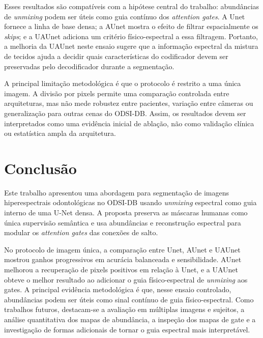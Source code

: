 \documentclass[conference]{IEEEtran}
\begin{document}
Esses resultados são compatíveis com a hipótese central do trabalho:
abundâncias de \textit{unmixing} podem ser úteis como guia contínuo dos
\textit{attention gates}. A Unet fornece a linha de base densa; a AUnet
mostra o efeito de filtrar espacialmente os \textit{skips}; e a UAUnet adiciona
um critério físico-espectral a essa filtragem. Portanto, a melhoria da UAUnet
neste ensaio sugere que a informação espectral da mistura de tecidos ajuda a
decidir quais características do codificador devem ser preservadas pelo
decodificador durante a segmentação.

A principal limitação metodológica é que o protocolo é restrito a uma única
imagem. A divisão por pixels permite uma comparação controlada entre
arquiteturas, mas não mede robustez entre pacientes, variação entre câmeras ou
generalização para outras cenas do ODSI-DB. Assim, os resultados devem ser
interpretados como uma evidência inicial de ablação, não como validação clínica
ou estatística ampla da arquitetura.

\section{Conclusão}

Este trabalho apresentou uma abordagem para segmentação de imagens
hiperespectrais odontológicas no ODSI-DB usando \textit{unmixing} espectral como
guia interno de uma U-Net densa. A proposta preserva as máscaras humanas como
única supervisão semântica e usa abundâncias e reconstrução espectral para
modular os \textit{attention gates} das conexões de salto.

No protocolo de imagem única, a comparação entre Unet, AUnet e UAUnet
mostrou ganhos progressivos em acurácia balanceada e sensibilidade. AUnet
melhorou a recuperação de pixels positivos em relação à Unet,
e a UAUnet obteve o melhor resultado ao adicionar o guia físico-espectral de
\textit{unmixing} aos gates. A principal evidência metodológica é que, nesse
ensaio controlado, abundâncias podem ser úteis como sinal contínuo de guia
físico-espectral. Como trabalhos futuros, destacam-se a avaliação em múltiplas
imagens e sujeitos, a análise quantitativa dos mapas de abundância, a inspeção
dos mapas de gate e a investigação de formas adicionais de tornar o guia
espectral mais interpretável.

\clearpage



\end{document}
